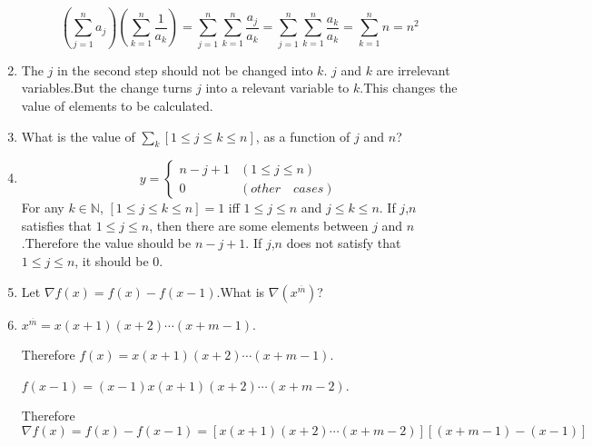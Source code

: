 \documentclass[12pt,a4paper]{article}
\makeatletter
\newtheorem*{solution}{Solution}
\theoremstyle{definition}
\renewenvironment{solution}[1][Solution] {\par\pushQED{\qed}\normalfont\topsep6\p@\@plus6\p@\relax\trivlist\item[\hskip\labelsep\bfseries#1\@addpunct{.}]\ignorespaces}{\popQED\endtrivlist\@endpefalse} \makeatother
\makeatother
\begin{document}
\begin{enumerate}
        \begin{equation*}
            (\sum_{j=1}^{n}a_j)(\sum_{k=1}^{n}\frac{1}{a_k})=\sum_{j=1}^{n}\sum_{k=1}^{n}\frac{a_j}{a_k}
            =\sum_{j=1}^{n}\sum_{k=1}^{n}\frac{a_k}{a_k}=\sum_{k=1}^{n}n=n^2
        \end{equation*}
        \begin{solution}
        	The $j$ in the second step should not be changed into $k$. $j$ and $k$ are irrelevant variables.But the change turns $j$ into a relevant variable to $k$.This changes the value of elements to be calculated.
        \end{solution}
    \item 
        What is the value of $\sum_{k}[1 \le j \le k \le n]$, as a function of $j$ and $n$?
        \begin{solution}
        	\begin{equation*}
        	    y=
        	    \begin{cases}
        	        n-j+1 & (1\le j \le n)\\
        	        0 & (other\quad cases)
        	    \end{cases}
        	\end{equation*}
        	For any $k\in \mathbb{N}$, $[1 \le j \le k \le n]=1$ iff $1 \le j \le n$ and $j \le k \le n$.
            If $j$,$n$ satisfies that $1 \le j \le n$, then there are some elements between $j$ and $n$.Therefore the value should be $n-j+1$.
            If $j$,$n$ does not satisfy that $1 \le j \le n$, it should be $0$.
        \end{solution}
    \item 
        Let $\nabla f(x)=f(x)-f(x-1)$.What is $\nabla(x^{\overline{m}})$?
        \begin{solution}
        	$x^{\overline{m}}=x(x+1)(x+2)\cdots(x+m-1)$.
        	
        	Therefore $f(x)=x(x+1)(x+2)\cdots(x+m-1)$.
        	
            $f(x-1)=(x-1)x(x+1)(x+2)\cdots(x+m-2)$.
        	
        	Therefore $\nabla f(x)=f(x)-f(x-1)=[x(x+1)(x+2)\cdots(x+m-2)][(x+m-1)-(x-1)]$
        	

\end{solution}
\end{enumerate}
\end{document}
